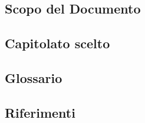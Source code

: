 \subsection{Scopo del Documento}

\subsection{Capitolato scelto}

\subsection{Glossario}

\subsection{Riferimenti}

